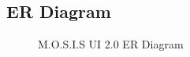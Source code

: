 \subsection{ER Diagram}
\begin{center}
  \centering
\begin{figure}[ht!]
  \caption{M.O.S.I.S UI 2.0 ER Diagram}
\end{figure}
\end{center}